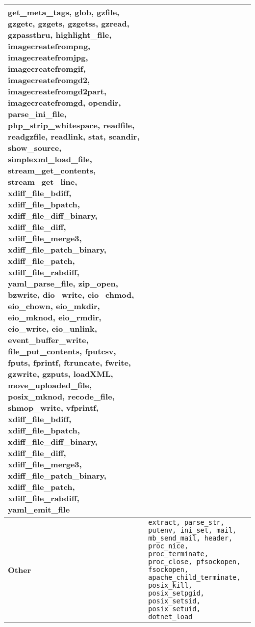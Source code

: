 \begin{table*}[t]
\begin{adjustbox}{max width=\textwidth}
\begin{tabular}{|l|p{20cm}|}
{    get\_meta\_tags, glob, gzfile, gzgetc, gzgets, gzgetss, gzread, gzpassthru, highlight\_file, imagecreatefrompng, imagecreatefromjpg, imagecreatefromgif, imagecreatefromgd2, 
    imagecreatefromgd2part, imagecreatefromgd, opendir, parse\_ini\_file, php\_strip\_whitespace, readfile, readgzfile, readlink, stat, scandir, show\_source, simplexml\_load\_file, stream\_get\_contents, 
    stream\_get\_line, xdiff\_file\_bdiff, xdiff\_file\_bpatch, xdiff\_file\_diff\_binary, xdiff\_file\_diff, xdiff\_file\_merge3, xdiff\_file\_patch\_binary, xdiff\_file\_patch, xdiff\_file\_rabdiff, yaml\_parse\_file, zip\_open,
    bzwrite, dio\_write, eio\_chmod, eio\_chown, eio\_mkdir, eio\_mknod, eio\_rmdir, eio\_write, eio\_unlink, event\_buffer\_write, file\_put\_contents, fputcsv, fputs, fprintf, ftruncate, fwrite, 
    gzwrite, gzputs, loadXML, move\_uploaded\_file, posix\_mknod, recode\_file, shmop\_write, vfprintf, xdiff\_file\_bdiff, xdiff\_file\_bpatch, xdiff\_file\_diff\_binary, xdiff\_file\_diff, xdiff\_file\_merge3, 
    xdiff\_file\_patch\_binary, xdiff\_file\_patch, xdiff\_file\_rabdiff, yaml\_emit\_file} \\ \hline 
    \textbf{Other} & \texttt{extract, parse\_str, putenv, ini\_set, mail, mb\_send\_mail, header, proc\_nice, proc\_terminate, proc\_close, pfsockopen, fsockopen, 
    apache\_child\_terminate, posix\_kill, posix\_setpgid, posix\_setsid, posix\_setuid, dotnet\_load} \\ \hline 
\end{tabular}
\end{adjustbox}
\end{table*}